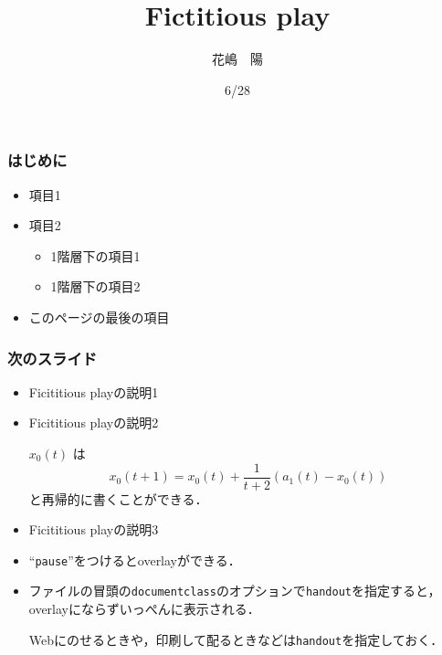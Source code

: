 \documentclass[dvipdfmx,fleqn,handout]{beamer}
\title{\Large Fictitious play}
\author{\large 花嶋　陽}
\date{\small 6/28}
\begin{document}
\sffamily
\gtfamily


\begin{frame}
  \titlepage
  \thispagestyle{empty}
\end{frame}

\setcounter{framenumber}{0}




\begin{frame}
\frametitle{はじめに}
\begin{itemize}\setlength{\parskip}{0.5em}
\item
項目1

\item
項目2
 \begin{itemize}\setlength{\parskip}{0.5em}
 \item
 1階層下の項目1
 \item
 1階層下の項目2
 \end{itemize}

\item
このページの最後の項目
\end{itemize}
\end{frame}



\begin{frame}
\frametitle{次のスライド}
\begin{itemize}\setlength{\parskip}{0.5em}
\item
Ficititious playの説明1

\item
Ficititious playの説明2 \pause

$x_0(t)$ は
\[
x_0(t+1)
= x_0(t) + \frac{1}{t+2} (a_1(t) - x_0(t))
\]
と再帰的に書くことができる． \pause

\item
Ficititious playの説明3 \pause

\item
``\texttt{pause}''をつけるとoverlayができる．

\item
ファイルの冒頭の\texttt{documentclass}のオプションで\texttt{handout}を指定すると，
overlayにならずいっぺんに表示される．

Webにのせるときや，印刷して配るときなどは\texttt{handout}を指定しておく．

\end{itemize}
\end{frame}
\end{document}
